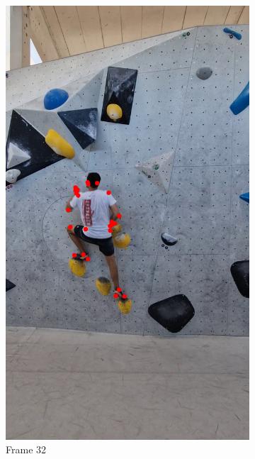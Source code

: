 \documentclass[./main.tex]{subfiles}
\begin{document}
\begin{figure}[htbp]
\begin{subfigure}{0.3\textwidth}
        \includegraphics[width=\textwidth]{entities/CA_32.png}
        \caption{Frame 32}
    \end{subfigure}
    \begin{subfigure}{0.3\textwidth}
        \centering

\end{subfigure}
\end{figure}
\end{document}
